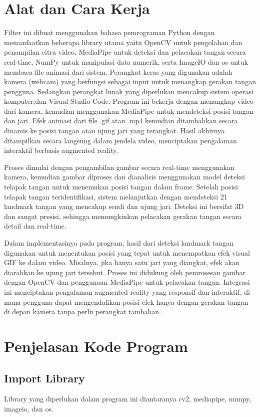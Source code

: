 \documentclass[11pt,a4paper]{article}
\begin{document}
\section{Alat dan Cara Kerja}
Filter ini dibuat menggunakan bahasa pemrograman Python dengan memanfaatkan beberapa library utama yaitu OpenCV untuk pengolahan dan penampilan citra video, MediaPipe untuk deteksi dan pelacakan tangan secara real-time, NumPy untuk manipulasi data numerik, serta ImageIO dan os untuk membaca file animasi dari sistem. Perangkat keras yang digunakan adalah kamera (webcam) yang berfungsi sebagai input untuk menangkap gerakan tangan pengguna. Sedangkan perangkat lunak yang diperlukan mencakup sistem operasi komputer,dan Visual Studio Code. Program ini bekerja dengan menangkap video dari kamera, kemudian menggunakan MediaPipe untuk mendeteksi posisi tangan dan jari. Efek animasi dari file .gif atau .mp4 kemudian ditambahkan secara dinamis ke posisi tangan atau ujung jari yang terangkat. Hasil akhirnya ditampilkan secara langsung dalam jendela video, menciptakan pengalaman interaktif berbasis augmented reality.
    
Proses dimulai dengan pengambilan gambar secara real-time menggunakan kamera, kemudian gambar diproses dan dianalisis menggunakan model deteksi telapak tangan untuk menemukan posisi tangan dalam frame. Setelah posisi telapak tangan teridentifikasi, sistem melanjutkan dengan mendeteksi 21 landmark tangan yang mencakup sendi dan ujung jari. Deteksi ini bersifat 3D dan sangat presisi, sehingga memungkinkan pelacakan gerakan tangan secara detail dan real-time.

Dalam implementasinya pada program, hasil dari deteksi landmark tangan digunakan untuk menentukan posisi yang tepat untuk menempatkan efek visual GIF ke dalam video. Misalnya, jika hanya satu jari yang diangkat, efek akan diarahkan ke ujung jari tersebut. Proses ini didukung oleh pemrosesan gambar dengan OpenCV dan penggunaan MediaPipe untuk pelacakan tangan. Integrasi ini menciptakan pengalaman augmented reality yang responsif dan interaktif, di mana pengguna dapat mengendalikan posisi efek hanya dengan gerakan tangan di depan kamera tanpa perlu perangkat tambahan.
    
\section{Penjelasan Kode Program}
    \subsection{Import Library}
    Library yang diperlukan dalam program ini diantaranya cv2, mediapipe, numpy, imageio, dan os.
\end{document}
